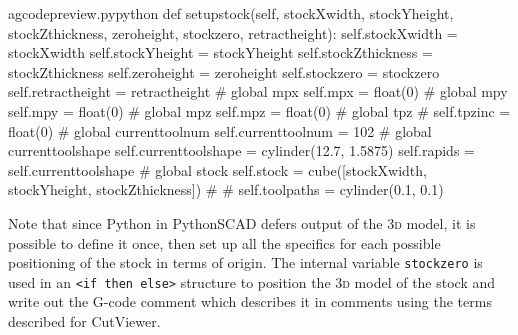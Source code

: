 \documentclass{ltxdoc}
\begin{document}
\lstset{firstnumber=\thegcpy}
\begin{writecode}{a}{gcodepreview.py}{python}
    def setupstock(self, stockXwidth,
                 stockYheight,
                 stockZthickness,
                 zeroheight,
                 stockzero,
                 retractheight):
        self.stockXwidth = stockXwidth
        self.stockYheight = stockYheight
        self.stockZthickness = stockZthickness
        self.zeroheight = zeroheight
        self.stockzero = stockzero
        self.retractheight = retractheight  
#        global mpx
        self.mpx = float(0)
#        global mpy
        self.mpy = float(0)
#        global mpz
        self.mpz = float(0)
#        global tpz
#        self.tpzinc = float(0)
#        global currenttoolnum
        self.currenttoolnum = 102
#        global currenttoolshape
        self.currenttoolshape = cylinder(12.7, 1.5875)
        self.rapids = self.currenttoolshape
#        global stock
        self.stock = cube([stockXwidth, stockYheight, stockZthickness])
#%
#%
        self.toolpaths = cylinder(0.1, 0.1)
\end{writecode}
\addtocounter{gcpy}{30}

%    

\noindent Note that since Python in PythonSCAD defers output of the \textsc{3d} model, it is possible to define it once, then set up all the specifics for each possible positioning of the stock in terms of origin. The internal variable \verb|stockzero| is used in an \verb|<if then else>| structure to position the \textsc{3d} model of the stock and write out the G-code comment which describes it in comments using the terms described for CutViewer. 
\end{document}
